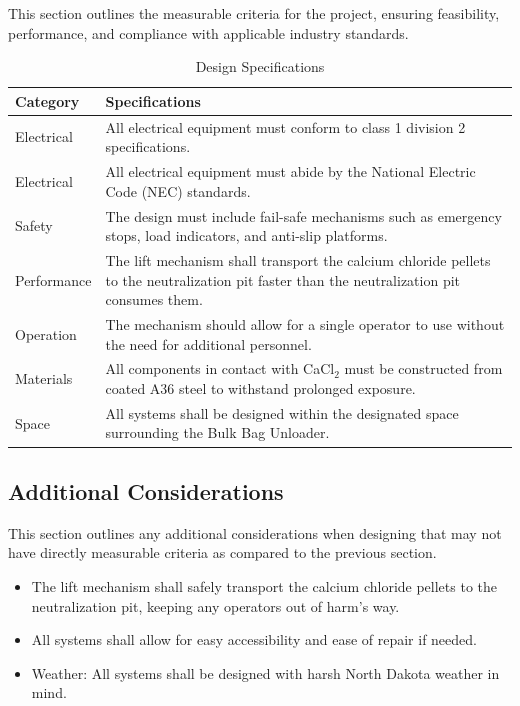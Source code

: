 \documentclass[10pt]{project}
\begin{document}
This section outlines the measurable criteria for the project, ensuring feasibility, performance, and compliance with applicable industry standards. 

\begin{table}[htbp]
\centering
\caption{Design Specifications}
\begin{tabular}{|p{}|p{}|}
\hline
\textbf{Category} & \textbf{Specifications} \\
\hline
\hline
Electrical & All electrical equipment must conform to class 1 division 2 specifications. \\
\hline
Electrical & All electrical equipment must abide by the National Electric Code (NEC) standards. \\
\hline
Safety & The design must include fail-safe mechanisms such as emergency stops, load indicators, and anti-slip platforms. \\
\hline
Performance & The lift mechanism shall transport the calcium chloride pellets to the neutralization pit faster than the neutralization pit consumes them. \\
\hline
Operation & The mechanism should allow for a single operator to use without the need for additional personnel. \\
\hline
Materials & All components in contact with CaCl$_2$ must be constructed from coated A36 steel to withstand prolonged exposure. \\
\hline
Space & All systems shall be designed within the designated space surrounding the Bulk Bag Unloader. \\
\hline
\end{tabular}
\end{table}



\subsection{Additional Considerations} %
This section outlines any additional considerations when designing that may not have directly measurable criteria as compared to the previous section. 

\begin{itemize}[noitemsep, topsep=0pt]
    \item The lift mechanism shall safely transport the calcium chloride pellets to the neutralization pit, keeping any operators out of harm's way. 
    \item All systems shall allow for easy accessibility and ease of repair if needed.
    \item Weather: All systems shall be designed with harsh North Dakota weather in mind.
\end{itemize}
\end{document}
